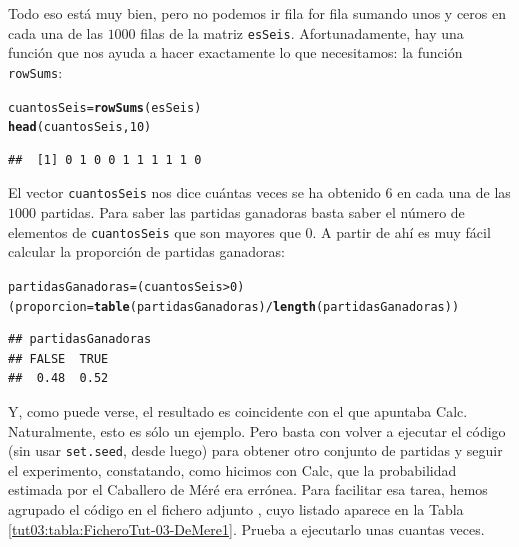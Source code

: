\documentclass[10pt,a4paper]{article}\usepackage[]{graphicx}\usepackage[]{color}
\makeatletter
\newcommand{\hlnum}[1]{\textcolor[rgb]{0.686,0.059,0.569}{#1}}%
\newcommand{\hlopt}[1]{\textcolor[rgb]{0,0,0}{#1}}%
\newcommand{\hlstd}[1]{\textcolor[rgb]{0.345,0.345,0.345}{#1}}%
\newcommand{\hlkwb}[1]{\textcolor[rgb]{0.69,0.353,0.396}{#1}}%
\newcommand{\hlkwd}[1]{\textcolor[rgb]{0.737,0.353,0.396}{\textbf{#1}}}%
\newenvironment{kframe}{%
 \def\at@end@of@kframe{}%
 \ifinner\ifhmode%
  \def\at@end@of@kframe{\end{minipage}}%
  \begin{minipage}{\columnwidth}%
 \fi\fi%
 \def\FrameCommand##1{\hskip\@totalleftmargin \hskip-\fboxsep
 \colorbox{shadecolor}{##1}\hskip-\fboxsep
     \hskip-\linewidth \hskip-\@totalleftmargin \hskip\columnwidth}%
 \MakeFramed {\advance\hsize-\width
   \@totalleftmargin\z@ \linewidth\hsize
   \@setminipage}}%
 {\par\unskip\endMakeFramed%
 \at@end@of@kframe}
\newenvironment{knitrout}{}{} %
\makeatother
\begin{document}
                                                                                                                                                            Todo eso está muy bien, pero no podemos ir fila for fila sumando unos y ceros en cada una de las $1000$ filas de la matriz {\tt esSeis}. Afortunadamente, hay una función que nos ayuda a hacer exactamente lo que necesitamos: la función {\tt rowSums}:
\begin{knitrout}
\color{fgcolor}\begin{kframe}
\begin{alltt}
\hlstd{cuantosSeis} \hlkwb{=} \hlkwd{rowSums}\hlstd{(esSeis)}
                                                                                                                                                            \hlkwd{head}\hlstd{(cuantosSeis,} \hlnum{10}\hlstd{)}
\end{alltt}
\begin{verbatim}
##  [1] 0 1 0 0 1 1 1 1 1 0
\end{verbatim}
\end{kframe}
\end{knitrout}
                                                                                                                                                                 El vector {\tt cuantosSeis} nos dice cuántas veces se ha obtenido $6$ en cada una de las $1000$ partidas. Para saber las partidas ganadoras basta saber el número de elementos de {\tt cuantosSeis} que son mayores que $0$.  A partir de ahí es muy fácil calcular la proporción de partidas ganadoras:
\begin{knitrout}
\color{fgcolor}\begin{kframe}
\begin{alltt}
\hlstd{partidasGanadoras} \hlkwb{=} \hlstd{(cuantosSeis} \hlopt{>} \hlnum{0}\hlstd{)}
                                                                                                                                                            \hlstd{(proporcion} \hlkwb{=} \hlkwd{table}\hlstd{(partidasGanadoras)}\hlopt{/}\hlkwd{length}\hlstd{(partidasGanadoras))}
\end{alltt}
\begin{verbatim}
## partidasGanadoras
## FALSE  TRUE 
##  0.48  0.52
\end{verbatim}
\end{kframe}
\end{knitrout}
                                                                                                                                                                 Y, como puede verse, el resultado es coincidente con el que apuntaba Calc. Naturalmente, esto es sólo un ejemplo. Pero basta con volver a ejecutar el código (sin usar {\tt set.seed}, desde luego) para obtener otro conjunto de partidas y seguir el  experimento, constatando, como hicimos con Calc, que la probabilidad estimada por el Caballero de Méré era errónea. Para facilitar esa tarea, hemos agrupado el código en el fichero adjunto , cuyo listado aparece en la Tabla \ref{tut03:tabla:FicheroTut-03-DeMere1}. Prueba a ejecutarlo unas cuantas veces.
\end{document}
